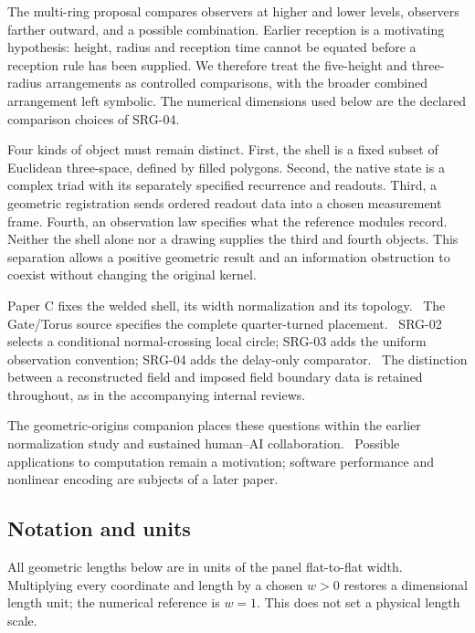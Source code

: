 \documentclass[11pt,a4paper]{article}
\begin{document}
The multi-ring proposal compares observers at higher and lower levels, observers farther outward, and a possible combination. Earlier reception is a motivating hypothesis: height, radius and reception time cannot be equated before a reception rule has been supplied. We therefore treat the five-height and three-radius arrangements as controlled comparisons, with the broader combined arrangement left symbolic. The numerical dimensions used below are the declared comparison choices of SRG-04.~\cite{AuthorMulti,SRG04}

Four kinds of object must remain distinct. First, the shell is a fixed subset of Euclidean three-space, defined by filled polygons. Second, the native state is a complex triad with its separately specified recurrence and readouts. Third, a geometric registration sends ordered readout data into a chosen measurement frame. Fourth, an observation law specifies what the reference modules record. Neither the shell alone nor a drawing supplies the third and fourth objects. This separation allows a positive geometric result and an information obstruction to coexist without changing the original kernel.

Paper C fixes the welded shell, its width normalization and its topology.~\cite[Secs.~2--5]{PC} The Gate/Torus source specifies the complete quarter-turned placement.~\cite[Sec.~6]{Gate} SRG-02 selects a conditional normal-crossing local circle; SRG-03 adds the uniform observation convention; SRG-04 adds the delay-only comparator.~\cite{SRG02,SRG03,SRG04} The distinction between a reconstructed field and imposed field boundary data is retained throughout, as in the accompanying internal reviews.~\cite{Reviews}

The geometric-origins companion places these questions within the earlier normalization study and sustained human--AI collaboration.~\cite[Secs.~1--3]{Origins} Possible applications to computation remain a motivation; software performance and nonlinear encoding are subjects of a later paper.

\subsection{Notation and units}\label{sec:notation}
All geometric lengths below are in units of the panel flat-to-flat width. Multiplying every coordinate and length by a chosen $w>0$ restores a dimensional length unit; the numerical reference is $w=1$. This does not set a physical length scale.
\end{document}
